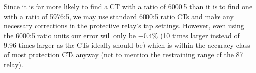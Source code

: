 Since it is far more likely to find a CT with a ratio of 6000:5 than it is to find one with a ratio of 5976:5, we may use standard 6000:5 ratio CTs and make any necessary corrections in the protective relay's tap settings.  However, even using the 6000:5 ratio units our error will only be $-0.4$\% (10 times larger instead of 9.96 times larger as the CTs ideally should be) which is within the accuracy class of most protection CTs anyway (not to mention the restraining range of the 87 relay). 












